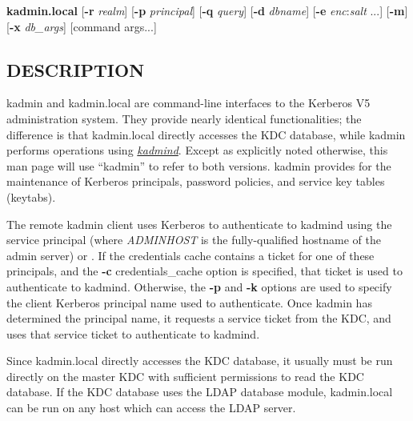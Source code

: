 \documentclass[letterpaper,10pt,english]{sphinxmanual}
\begin{document}
\textbf{kadmin.local}
{[}\textbf{-r} \emph{realm}{]}
{[}\textbf{-p} \emph{principal}{]}
{[}\textbf{-q} \emph{query}{]}
{[}\textbf{-d} \emph{dbname}{]}
{[}\textbf{-e} \emph{enc}:\emph{salt} ...{]}
{[}\textbf{-m}{]}
{[}\textbf{-x} \emph{db\_args}{]}
{[}command args...{]}


\subsection{DESCRIPTION}
\label{admin/admin_commands/kadmin_local:kadmin-synopsis-end}\label{admin/admin_commands/kadmin_local:description}
kadmin and kadmin.local are command-line interfaces to the Kerberos V5
administration system.  They provide nearly identical functionalities;
the difference is that kadmin.local directly accesses the KDC
database, while kadmin performs operations using {\hyperref[admin/admin_commands/kadmind:kadmind-8]{\emph{kadmind}}}.
Except as explicitly noted otherwise, this man page will use ``kadmin''
to refer to both versions.  kadmin provides for the maintenance of
Kerberos principals, password policies, and service key tables
(keytabs).

The remote kadmin client uses Kerberos to authenticate to kadmind
using the service principal  (where \emph{ADMINHOST} is
the fully-qualified hostname of the admin server) or .
If the credentials cache contains a ticket for one of these
principals, and the \textbf{-c} credentials\_cache option is specified, that
ticket is used to authenticate to kadmind.  Otherwise, the \textbf{-p} and
\textbf{-k} options are used to specify the client Kerberos principal name
used to authenticate.  Once kadmin has determined the principal name,
it requests a service ticket from the KDC, and uses that service
ticket to authenticate to kadmind.

Since kadmin.local directly accesses the KDC database, it usually must
be run directly on the master KDC with sufficient permissions to read
the KDC database.  If the KDC database uses the LDAP database module,
kadmin.local can be run on any host which can access the LDAP server.
\end{document}
